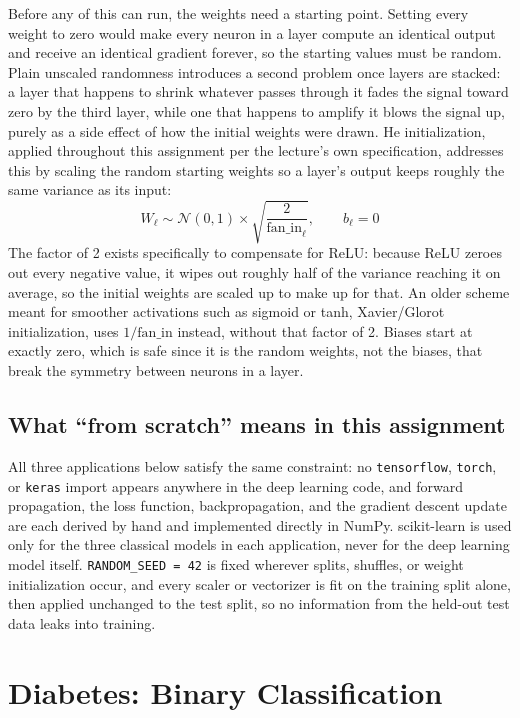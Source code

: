 \documentclass[11pt]{article}
\newcommand{\code}[1]{\texttt{#1}}
\begin{document}
Before any of this can run, the weights need a starting point. Setting every weight to zero
would make every neuron in a layer compute an identical output and receive an identical
gradient forever, so the starting values must be random. Plain unscaled randomness
introduces a second problem once layers are stacked: a layer that happens to shrink
whatever passes through it fades the signal toward zero by the third layer, while one that
happens to amplify it blows the signal up, purely as a side effect of how the initial
weights were drawn. He initialization, applied throughout this assignment per the
lecture's own specification, addresses this by scaling the random starting weights so a
layer's output keeps roughly the same variance as its input:
\[
W_\ell \sim \mathcal{N}(0, 1) \times \sqrt{\dfrac{2}{\mathrm{fan\_in}_\ell}}, \qquad b_\ell = 0
\]
The factor of 2 exists specifically to compensate for ReLU: because ReLU zeroes out every
negative value, it wipes out roughly half of the variance reaching it on average, so the
initial weights are scaled up to make up for that. An older scheme meant for smoother
activations such as sigmoid or tanh, Xavier/Glorot initialization, uses
$1/\mathrm{fan\_in}$ instead, without that factor of 2. Biases start at exactly zero,
which is safe since it is the random weights, not the biases, that break the symmetry
between neurons in a layer.

\subsection{What ``from scratch'' means in this assignment}

All three applications below satisfy the same constraint: no \code{tensorflow},
\code{torch}, or \code{keras} import appears anywhere in the deep learning code, and
forward propagation, the loss function, backpropagation, and the gradient descent update
are each derived by hand and implemented directly in NumPy. scikit-learn is used only for
the three classical models in each application, never for the deep learning model itself.
\code{RANDOM\_SEED = 42} is fixed wherever splits, shuffles, or weight initialization
occur, and every scaler or vectorizer is fit on the training split alone, then applied
unchanged to the test split, so no information from the held-out test data leaks into
training.

\section{Diabetes: Binary Classification}
\label{sec:diabetes}
\end{document}
